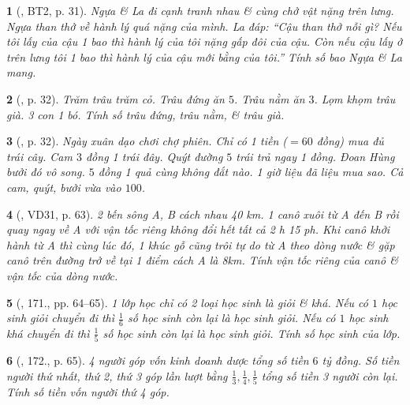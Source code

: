 \documentclass{article}
\newtheorem{baitoan}{}
\begin{document}
\begin{baitoan}[\cite{Binh_boi_duong_Toan_9_tap_2}, BT2, p. 31]
	Ngựa \& La đi cạnh tranh nhau \& cùng chở vật nặng trên lưng. Ngựa than thở về hành lý quá nặng của mình. La đáp: ``Cậu than thở nỗi gì? Nếu tôi lấy của cậu 1 bao thì hành lý của tôi nặng gấp đôi của cậu. Còn nếu cậu lấy ở trên lưng tôi 1 bao thì hành lý của cậu mới bằng của tôi.'' Tính số bao Ngựa \& La mang.
\end{baitoan}

\begin{baitoan}[\cite{Binh_boi_duong_Toan_9_tap_2}, p. 32]
	Trăm trâu trăm cỏ. Trâu đứng ăn $5$. Trâu nằm ăn $3$. Lọm khọm trâu già. 3 con 1 bó. Tính số trâu đứng, trâu nằm, \& trâu già.
\end{baitoan}

\begin{baitoan}[\cite{Binh_boi_duong_Toan_9_tap_2}, p. 32]
	Ngày xuân dạo chơi chợ phiên. Chỉ có 1 tiền ($= 60$ đồng) mua đủ trái cây. Cam $3$ đồng 1 trái đây. Quýt đường $5$ trái trả ngay 1 đồng. Đoan Hùng bưởi đó vô song. $5$ đồng 1 quả cùng không đắt nào. 1 giờ liệu đã liệu mua sao. Cả cam, quýt, bưởi vừa vào $100$.
\end{baitoan}

\begin{baitoan}[\cite{Tuyen_Toan_9_old}, VD31, p. 63]
	2 bến sông A, B cách nhau {\rm40 km}. 1 canô xuôi từ A đến B rồi quay ngay về A với vận tốc riêng không đổi hết tất cả {\rm2 h 15 ph}. Khi canô khởi hành từ A thì cùng lúc đó, 1 khúc gỗ cũng trôi tự do từ A theo dòng nước \& gặp canô trên đường trở về tại 1 điểm cách A là {\rm 8km}. Tính vận tốc riêng của canô \& vận tốc của dòng nước.
\end{baitoan}

\begin{baitoan}[\cite{Tuyen_Toan_9_old}, 171., pp. 64--65]
	1 lớp học chỉ có 2 loại học sinh là giỏi \& khá. Nếu có $1$ học sinh giỏi chuyển đi thì $\frac{1}{6}$ số học sinh còn lại là học sinh giỏi. Nếu có $1$ học sinh khá chuyển đi thì $\frac{1}{5}$ số học sinh còn lại là học sinh giỏi. Tính số học sinh của lớp.
\end{baitoan}

\begin{baitoan}[\cite{Tuyen_Toan_9_old}, 172., p. 65]
	4 người góp vốn kinh doanh dược tổng số tiền $6$ tỷ đồng. Số tiền người thứ nhất, thứ 2, thứ 3 góp lần lượt bằng $\frac{1}{3},\frac{1}{4},\frac{1}{5}$ tổng số tiền 3 người còn lại. Tính số tiền vốn người thứ 4 góp.
\end{baitoan}
\end{document}
